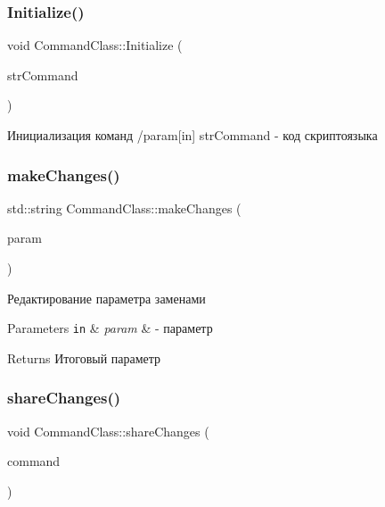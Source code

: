 \subsubsection{\texorpdfstring{Initialize()}{Initialize()}}
{\footnotesize\ttfamily void Command\+Class\+::\+Initialize (\begin{DoxyParamCaption}\item[{const std\+::string \&}]{str\+Command }\end{DoxyParamCaption})}



Инициализация команд /param\mbox{[}in\mbox{]} str\+Command -\/ код скриптоязыка 

\mbox{\label{class_command_class_aa61ed7cacbaf102c7f36288eba2c06df}} 
\subsubsection{\texorpdfstring{make\+Changes()}{makeChanges()}}
{\footnotesize\ttfamily std\+::string Command\+Class\+::make\+Changes (\begin{DoxyParamCaption}\item[{const std\+::string \&}]{param }\end{DoxyParamCaption})}



Редактирование параметра заменами 


\begin{DoxyParams}[1]{Parameters}
\mbox{\tt in}  & {\em param} & -\/ параметр \\
\hline
\end{DoxyParams}
\begin{DoxyReturn}{Returns}
Итоговый параметр 
\end{DoxyReturn}
\mbox{\label{class_command_class_ab345ed83c10eeb74a976061566b62793}} 
\subsubsection{\texorpdfstring{share\+Changes()}{shareChanges()}}
{\footnotesize\ttfamily void Command\+Class\+::share\+Changes (\begin{DoxyParamCaption}\item[{\hyperlink{class_command_class}{Command\+Class} $\ast$}]{command }\end{DoxyParamCaption})}



